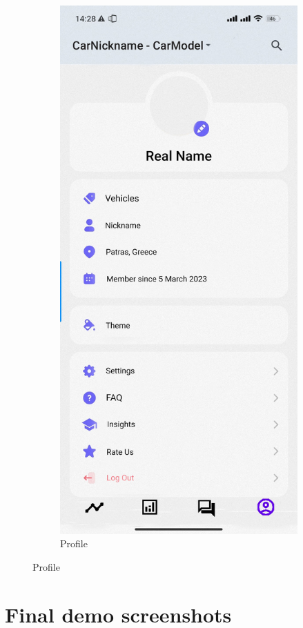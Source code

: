 \documentclass[11pt]{scrartcl} %
\begin{document}
\begin{figure}[!htb]
\begin{subfigure}{.5\textwidth}
  \includegraphics[width=.6\linewidth]{assets/profile_mock_up.jpg}
  \caption{Profile}
  \label{fig:sfig4}
\end{subfigure}
\label{fig:fig}
\end{figure}

\section{Final demo screenshots}
\end{document}
